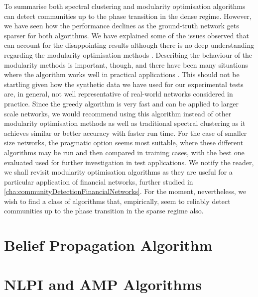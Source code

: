 To summarise both spectral clustering and modularity optimisation algorithms can detect communities up to the phase transition in the dense regime.
However, we have seen how the performance declines as the ground-truth network gets sparser for both algorithms.
We have explained some of the issues observed that can account for the disappointing results although there is no deep understanding regarding the modularity optimisation methods \cite{For10}.
Describing the behaviour of the modularity methods is important, though, and there have been many situations where the algorithm works well in practical applications \cite{New06a,New06b,For10,GMC10}.
This should not be startling given how the synthetic data we have used for our experimental tests are, in general, not well representative of real-world networks considered in practice.
Since the greedy algorithm is very fast and can be applied to larger scale networks, we would recommend using this algorithm instead of other modularity optimisation methods as well as traditional spectral clustering as it achieves similar or better accuracy with faster run time.
For the case of smaller size networks, the pragmatic option seems most suitable, where these different algorithms may be run and then compared in training cases, with the best one evaluated used for further investigation in test applications.
We notify the reader, we shall revisit modularity optimisation algorithms as they are useful for a particular application of financial networks, further studied in \cref{cha:communityDetectionFinancialNetworks}.
For the moment, nevertheless, we wish to find a class of algorithms that, empirically, seem to reliably detect communities up to the phase transition in the sparse regime also.


\section{Belief Propagation Algorithm}
\label{sec:beliefPropagationAlgorithmTest}


\section{NLPI and AMP Algorithms}
\label{sec:NLPIAndAMPAlgorithms}

